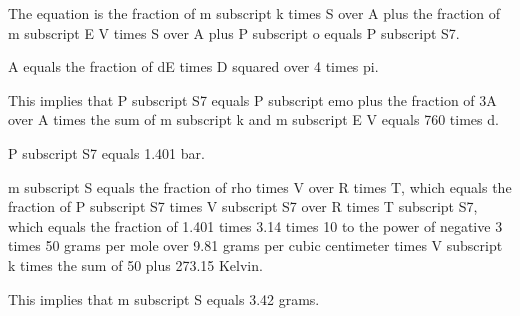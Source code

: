 The equation is the fraction of m subscript k times S over A plus the fraction of m subscript E V times S over A plus P subscript o equals P subscript S7.

A equals the fraction of dE times D squared over 4 times pi.

This implies that P subscript S7 equals P subscript emo plus the fraction of 3A over A times the sum of m subscript k and m subscript E V equals 760 times d.

P subscript S7 equals 1.401 bar.

m subscript S equals the fraction of rho times V over R times T, which equals the fraction of P subscript S7 times V subscript S7 over R times T subscript S7, which equals the fraction of 1.401 times 3.14 times 10 to the power of negative 3 times 50 grams per mole over 9.81 grams per cubic centimeter times V subscript k times the sum of 50 plus 273.15 Kelvin.

This implies that m subscript S equals 3.42 grams.